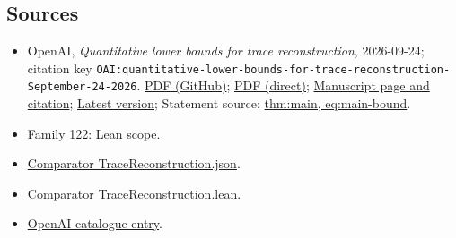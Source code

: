 \documentclass[11pt]{article}
\begin{document}
\subsection{Sources}
\begin{itemize}
\item OpenAI, \emph{Quantitative lower bounds for trace reconstruction}, 2026-09-24; citation key \texttt{OAI:quantitative-lower-bounds-for-trace-reconstruction-September-24-2026}. \href{https://github.com/openai/math/blob/adc7f1241b42e322a6451854ab7e4b4c146bf78a/preprints/quantitative-lower-bounds-for-trace-reconstruction-September-24-2026/paper.pdf}{PDF (GitHub)}; \href{https://github.com/openai/math/raw/adc7f1241b42e322a6451854ab7e4b4c146bf78a/preprints/quantitative-lower-bounds-for-trace-reconstruction-September-24-2026/paper.pdf}{PDF (direct)}; \href{https://github.com/openai/math/blob/adc7f1241b42e322a6451854ab7e4b4c146bf78a/preprints/quantitative-lower-bounds-for-trace-reconstruction-September-24-2026/README.md}{Manuscript page and citation}; \href{https://github.com/openai/math/blob/main/preprints/quantitative-lower-bounds-for-trace-reconstruction-September-24-2026/paper.pdf}{Latest version}; Statement source: \href{https://github.com/openai/math/blob/adc7f1241b42e322a6451854ab7e4b4c146bf78a/preprints/quantitative-lower-bounds-for-trace-reconstruction-September-24-2026/build/sections/introduction.tex\#L7}{thm:main, eq:main-bound}.
\item Family 122: \href{https://github.com/openai/math/blob/adc7f1241b42e322a6451854ab7e4b4c146bf78a/lean/docs/122.md}{Lean scope}.
\item \href{https://github.com/openai/math/blob/adc7f1241b42e322a6451854ab7e4b4c146bf78a/lean/ComparatorChallenges/TraceReconstruction.json}{Comparator TraceReconstruction.json}.
\item \href{https://github.com/openai/math/blob/adc7f1241b42e322a6451854ab7e4b4c146bf78a/lean/ComparatorChallenges/TraceReconstruction.lean}{Comparator TraceReconstruction.lean}.
\item \href{https://github.com/openai/math/blob/adc7f1241b42e322a6451854ab7e4b4c146bf78a/CONTENTS.md}{OpenAI catalogue entry}.
\end{itemize}
\end{document}
